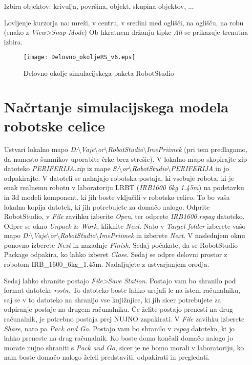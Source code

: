 \noindent Izbira objektov: krivulja, površina, objekt, skupina
objektov, ...

\noindent Lovljenje kurzorja na: mreži, v centru, v sredini med
oglišči, na oglišču, na robu \newline (enako z \textit{View>Snap
Mode})
\newline Ob hkratnem držanju tipke \textit{Alt} se prikazuje
trenutna izbira.


\begin{figure}[h]
\centering
\texttt{[image: Delovno\_okoljeRS\_v6.eps]}
  \caption{\label{figure1} Delovno okolje simulacijskega paketa RobotStudio}
\end{figure}


\newpage
\section{Načrtanje simulacijskega modela robotske celice}

Ustvari lokalno mapo \emph{D:$\setminus$Vaje$\setminus$or$\setminus$RobotStudio$\setminus$ImePriimek} (pri tem predlagamo, da namesto \v sumnikov uporabite \v crke brez stre\v sic). V lokalno mapo skopirajte zip datoteko \emph{PERIFERIJA.zip} iz mape \newline \emph{S:$\setminus$or$\setminus$RobotStudio$\setminus$PERIFERIJA} in jo odpakirajte. V datoteli se nahajajo robotska postaja, ki vsebuje robota, ki je enak realnemu robotu v laboratoriju LRBT (\emph{IRB1600 6kg 1.45m}) na podstavku in 3d modeli komponent, ki jih boste vklju\v cili v robotsko celico. To bo va\v sa lokalna kopija datotek, ki jih potrebujete za doma\v co nalogo. Odprite RobotStudio, v \emph{File} zavihku izberite  \emph{Open}, ter odprete  \emph{IRB1600.rspag} datoteko. Odpre se okno \emph{Unpack} \& \emph{Work}, kliknite \emph{Next}. Nato v \emph{Target folder} izberete va\v so mapo \emph{D:$\setminus$Vaje$\setminus$or$\setminus$RobotStudio$\setminus$ImePriimek} in izberete \emph{Next}. V naslednjem oknu ponovno izberete \emph{Next} in nazadnje \emph{Finish}. Sedaj po\v cakate, da se RobotStudio Package odpakira, ko lahko izberet \emph{Close}. Sedaj se odpre delovni prostor z robotom IRB\_1600\_6kg\_1.45m. Nadaljujete z ustvarjanjem orodja.

Sedaj lahko shranite postajo \emph{File>Save Station}. Postajo vam bo shranilo pod format datoteke \emph{rsstn}. To datoteko boste lahko urejali le na istem ra\v cunalniku, saj se v to datoteko na shranijo vse knji\v znjice, ki jih sicer potrebujete za odpiranje postaje na drugem ra\v cunalniku. \v Ce \v zelite postajo prenesti na drug ra\v cunalnik, je potrebno postaja prej NUJNO zapakirati. V \emph{File} zavihku izberete \emph{Share}, nato pa \emph{Pack and Go}. Postajo vam bo shranilo v \emph{rspag} datoteko, ki jo lahko preneste na drug ra\v cunalnik. Ko boste doma kon\v cali doma\v co nalogo jo morate nujno shraniti s \emph{Pack and Go}, sicer je ne bomo morali v laboratoriju, ko nam boste doma\v co nalogo \v zeleli predstaviti, odpakirati in pregledati.


